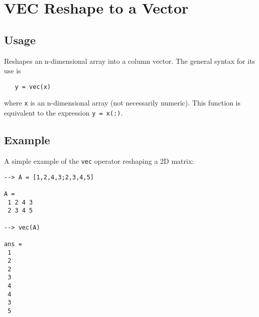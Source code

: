 \section{VEC Reshape to a Vector}

\subsection{Usage}

Reshapes an n-dimensional array into a column vector.  The general
syntax for its use is
\begin{verbatim}
   y = vec(x)
\end{verbatim}
where \verb|x| is an n-dimensional array (not necessarily numeric).  This
function is equivalent to the expression \verb|y = x(:)|.
\subsection{Example}

A simple example of the \verb|vec| operator reshaping a 2D matrix:
\begin{verbatim}
--> A = [1,2,4,3;2,3,4,5]

A = 
 1 2 4 3 
 2 3 4 5 

--> vec(A)

ans = 
 1 
 2 
 2 
 3 
 4 
 4 
 3 
 5 
\end{verbatim}
